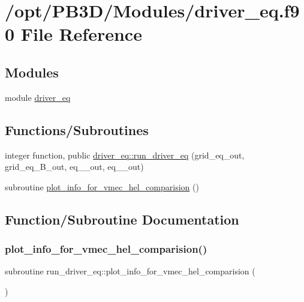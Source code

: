 \hypertarget{driver__eq_8f90}{}\section{/opt/\+P\+B3\+D/\+Modules/driver\+\_\+eq.f90 File Reference}
\label{driver__eq_8f90}
\subsection*{Modules}
\begin{DoxyCompactItemize}
\item 
module \hyperlink{namespacedriver__eq}{driver\+\_\+eq}
\end{DoxyCompactItemize}
\subsection*{Functions/\+Subroutines}
\begin{DoxyCompactItemize}
\item 
integer function, public \hyperlink{namespacedriver__eq_ac8eca434f541966edc3556d72f261eff}{driver\+\_\+eq\+::run\+\_\+driver\+\_\+eq} (grid\+\_\+eq\+\_\+out, grid\+\_\+eq\+\_\+\+B\+\_\+out, eq\+\_\+\_\+out, eq\+\_\+\_\+out)
\item 
subroutine \hyperlink{driver__eq_8f90_ad281a6a457fca3e46dd9e1ba4de9a632}{plot\+\_\+info\+\_\+for\+\_\+vmec\+\_\+hel\+\_\+comparision} ()
\end{DoxyCompactItemize}


\subsection{Function/\+Subroutine Documentation}
\mbox{\label{driver__eq_8f90_ad281a6a457fca3e46dd9e1ba4de9a632}} 
\subsubsection{\texorpdfstring{plot\+\_\+info\+\_\+for\+\_\+vmec\+\_\+hel\+\_\+comparision()}{plot\_info\_for\_vmec\_hel\_comparision()}}
{\footnotesize\ttfamily subroutine run\+\_\+driver\+\_\+eq\+::plot\+\_\+info\+\_\+for\+\_\+vmec\+\_\+hel\+\_\+comparision (\begin{DoxyParamCaption}{ }\end{DoxyParamCaption})}




